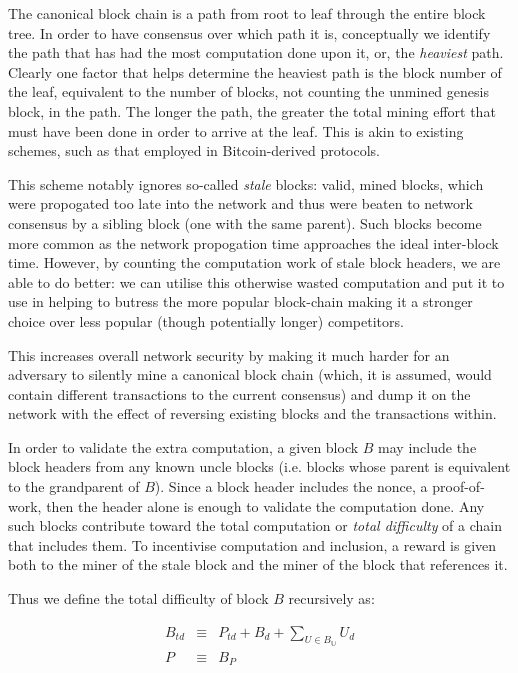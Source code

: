 \documentclass[9pt,oneside]{amsart}
\begin{document}
\begin{multicols}{2}
The canonical block chain is a path from root to leaf through the entire block tree. In order to have consensus over which path it is, conceptually we identify the path that has had the most computation done upon it, or, the \textit{heaviest} path. Clearly one factor that helps determine the heaviest path is the block number of the leaf, equivalent to the number of blocks, not counting the unmined genesis block, in the path. The longer the path, the greater the total mining effort that must have been done in order to arrive at the leaf. This is akin to existing schemes, such as that employed in Bitcoin-derived protocols.

This scheme notably ignores so-called \textit{stale} blocks: valid, mined blocks, which were propogated too late into the network and thus were beaten to network consensus by a sibling block (one with the same parent). Such blocks become more common as the network propogation time approaches the ideal inter-block time. However, by counting the computation work of stale block headers, we are able to do better: we can utilise this otherwise wasted computation and put it to use in helping to butress the more popular block-chain making it a stronger choice over less popular (though potentially longer) competitors.

This increases overall network security by making it much harder for an adversary to silently mine a canonical block chain (which, it is assumed, would contain different transactions to the current consensus) and dump it on the network with the effect of reversing existing blocks and the transactions within.

In order to validate the extra computation, a given block $B$ may include the block headers from any known uncle blocks (i.e. blocks whose parent is equivalent to the grandparent of $B$). Since a block header includes the nonce, a proof-of-work, then the header alone is enough to validate the computation done. Any such blocks contribute toward the total computation or \textit{total difficulty} of a chain that includes them. To incentivise computation and inclusion, a reward is given both to the miner of the stale block and the miner of the block that references it.

Thus we define the total difficulty of block $B$ recursively as:

\begin{eqnarray}
B_{td} & \equiv & P_{td} + B_d + \sum\limits_{U \in B_\mathbb{U}} U_d \\
P & \equiv & B_P
\end{eqnarray}


\end{multicols}
\end{document}

